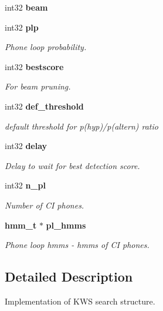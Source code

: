 \begin{DoxyCompactItemize}
\mbox{\label{structkws__search__s_a5a84597099359059301dc6124579732e}} 
int32 {\bfseries beam}
\item 
\mbox{\label{structkws__search__s_a3bfc1d19e39d1cd321ce47280f1abe00}} 
int32 \textbf{ plp}
\begin{DoxyCompactList}\small\item\em Phone loop probability. \end{DoxyCompactList}\item 
\mbox{\label{structkws__search__s_a0a04bba471516468d1b2bea14632f255}} 
int32 \textbf{ bestscore}
\begin{DoxyCompactList}\small\item\em For beam pruning. \end{DoxyCompactList}\item 
\mbox{\label{structkws__search__s_afce4456a796dbc72149d7a47159ccca9}} 
int32 \textbf{ def\+\_\+threshold}
\begin{DoxyCompactList}\small\item\em default threshold for p(hyp)/p(altern) ratio \end{DoxyCompactList}\item 
\mbox{\label{structkws__search__s_acf2597fd017db4c2f90a9ba54e08a20c}} 
int32 \textbf{ delay}
\begin{DoxyCompactList}\small\item\em Delay to wait for best detection score. \end{DoxyCompactList}\item 
\mbox{\label{structkws__search__s_aab6e42d0c93af992c16e2a75db386df4}} 
int32 \textbf{ n\+\_\+pl}
\begin{DoxyCompactList}\small\item\em Number of CI phones. \end{DoxyCompactList}\item 
\mbox{\label{structkws__search__s_a7b501f4cc5f4efb7b4ca0259afcf4e05}} 
\textbf{ hmm\+\_\+t} $\ast$ \textbf{ pl\+\_\+hmms}
\begin{DoxyCompactList}\small\item\em Phone loop hmms -\/ hmms of CI phones. \end{DoxyCompactList}\end{DoxyCompactItemize}


\subsection{Detailed Description}
Implementation of K\+WS search structure. 

